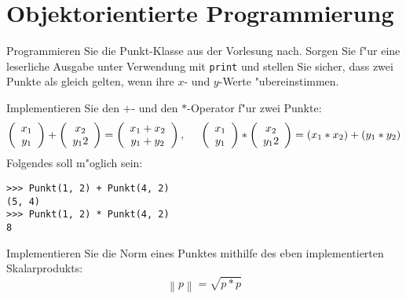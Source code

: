 \section*{Objektorientierte Programmierung}

\begin{aufgabe}
\begin{teilaufgabe}
Programmieren Sie die Punkt-Klasse aus der Vorlesung nach. Sorgen Sie f"ur eine leserliche Ausgabe unter Verwendung mit \texttt{print} und stellen Sie sicher, dass zwei Punkte als gleich gelten, wenn ihre $x$- und $y$-Werte "ubereinstimmen. \end{teilaufgabe}
\begin{teilaufgabe}
Implementieren Sie den $+$- und den $*$-Operator f"ur zwei Punkte:
\begin{displaymath}
\left(\begin{array}{c}
x_1\\
y_1
\end{array}\right)
+
\left(\begin{array}{c}
x_2\\
y_12
\end{array}\right)
=
\left(\begin{array}{c}
x_1 + x_2\\
y_1 + y_2
\end{array}\right), \hspace{5mm}
\left(\begin{array}{c}
x_1\\
y_1
\end{array}\right)
*
\left(\begin{array}{c}
x_2\\
y_12
\end{array}\right)
= (x_1 * x_2) + (y_1 * y_2)
\end{displaymath}
Folgendes soll m"oglich sein:
\begin{lstlisting}
>>> Punkt(1, 2) + Punkt(4, 2)
(5, 4)
>>> Punkt(1, 2) * Punkt(4, 2)
8
\end{lstlisting}
\end{teilaufgabe}

\begin{teilaufgabe}
Implementieren Sie die Norm eines Punktes mithilfe des eben implementierten Skalarprodukts:
\begin{displaymath}
\left\| p\right\| = \sqrt{p*p}
\end{displaymath}
\end{teilaufgabe}
\end{aufgabe}

